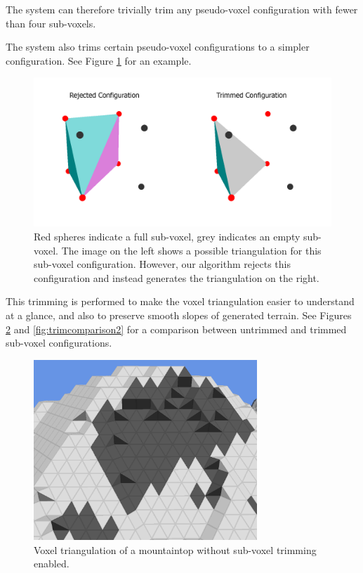 The system can therefore trivially trim any pseudo-voxel configuration with fewer than four sub-voxels.

The system also trims certain pseudo-voxel configurations to a simpler configuration.
See Figure \ref{fig:voxelrejected} for an example.

\begin{figure}
	\centering
		\includegraphics[width=1.0\textwidth]{figures/voxelrejected.png}
	\caption{
		Red spheres indicate a full sub-voxel, grey indicates an empty sub-voxel.
		The image on the left shows a possible triangulation for this sub-voxel configuration.
		However, our algorithm rejects this configuration and instead generates the triangulation on the right.
	}
	\label{fig:voxelrejected}
\end{figure}

This trimming is performed to make the voxel triangulation easier to understand at a glance, and also to preserve smooth slopes of generated terrain.
See Figures \ref{fig:trimcomparison1} and \ref{fig:trimcomparison2} for a comparison between untrimmed and trimmed sub-voxel configurations.

\begin{figure}
	\centering
		\includegraphics[width=0.75\textwidth]{figures/trimcomparison1.png}
	\caption{
		Voxel triangulation of a mountaintop without sub-voxel trimming enabled.
	}
	\label{fig:trimcomparison1}
\end{figure}


